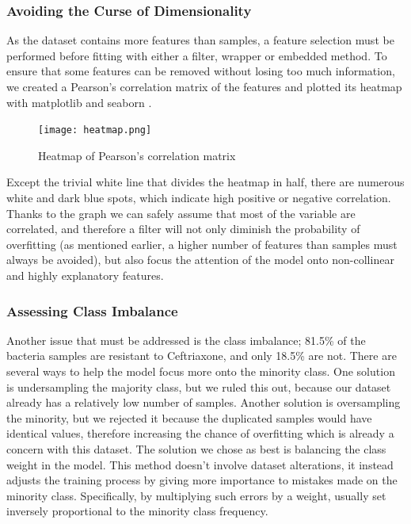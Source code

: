 \documentclass{article}
\begin{document}
\subsubsection{Avoiding the Curse of Dimensionality}

As the dataset contains more features than samples, a feature
selection must be performed before fitting with either a filter, wrapper or embedded method. To ensure
that some features can be removed without losing too much information, we created a Pearson’s correlation
matrix of the features and plotted its heatmap with matplotlib \citep{matplotlib} and seaborn \citep{seaborn}.\\

\begin{figure}
	\centering
	\texttt{[image: heatmap.png]}
	 \vspace{-3em}
	\caption{Heatmap of Pearson's correlation matrix}
\end{figure}

Except the trivial white line that divides the heatmap in half, there are numerous white and dark blue spots, which indicate high positive or negative correlation. Thanks to the graph we can safely assume that most of the variable are correlated, and therefore a filter will not only diminish the probability of overfitting (as mentioned earlier, a higher number of features than samples must always be avoided), but also focus the attention of the model onto non-collinear and highly explanatory features. 

\subsubsection{Assessing Class Imbalance}

Another issue that must be addressed is the class imbalance; 81.5\% of the bacteria samples are resistant to Ceftriaxone, and only 18.5\% are not. There are several ways to help the model focus more onto the minority class. One solution is undersampling the majority class, but we ruled this out, because our dataset already has a relatively low number of samples. Another solution is oversampling the minority, but we rejected it because the duplicated samples would have identical values, therefore increasing the chance of overfitting which is already a concern with this dataset. The solution we chose as best is balancing the class weight in the model. This method doesn't involve dataset alterations, it instead adjusts the training process by giving more importance to mistakes made on the minority class. Specifically, by multiplying such errors by a weight, usually set inversely proportional to the minority class frequency.
\end{document}
